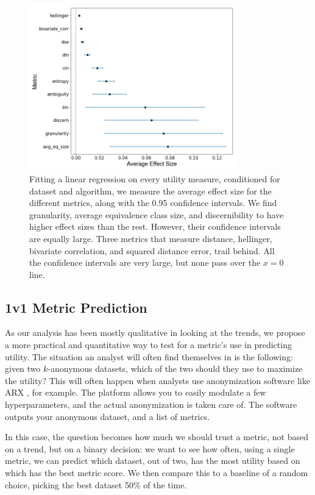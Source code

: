  
\begin{figure}[h]
    \centerfloat
    \includegraphics[width=0.8\textwidth]{project/fig/linreg_conf_interval.png}
    \caption{Fitting a linear regression on every utility measure, conditioned for dataset and algorithm, we measure the average effect size for the different metrics, along with the 0.95 confidence intervals. We find granularity, average equivalence class size, and discernibility to have higher effect sizes than the rest. However, their confidence intervals are equally large. Three metrics that measure distance, hellinger, bivariate correlation, and squared distance error, trail behind. All the confidence intervals are very large, but none pass over the $x=0$ line.}
    \label{fig:lin_reg}
\end{figure}


\subsection{1v1 Metric Prediction}
\label{sec:1v1_single}
As our analysis has been mostly qualitative in looking at the trends, we propose a more practical and quantitative way to test for a metric's use in predicting utility. The situation an analyst will often find themselves in is the following: given two $k$-anonymous datasets, which of the two should they use to maximize the utility? This will often happen when analysts use anonymization software like ARX \cite{arx}, for example. The platform allows you to easily modulate a few hyperparameters, and the actual anonymization is taken care of. The software outputs your anonymous dataset, and a list of metrics. 

In this case, the question becomes how much we should trust a metric, not based on a trend, but on a binary decision: we want to see how often, using a single metric, we can predict which dataset, out of two, has the most utility based on which has the best metric score. We then compare this to a baseline of a random choice, picking the best dataset 50\% of the time.

